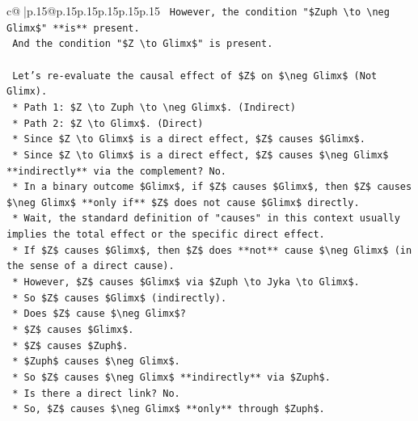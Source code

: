 \documentclass{article}
\begin{document}
{\begin{supertabular}{c@{$\;$}|p{.15\linewidth}@{}p{.15\linewidth}p{.15\linewidth}p{.15\linewidth}p{.15\linewidth}p{.15\linewidth}}
{{{\texttt{    However, the condition "\$Zuph \textbackslash{}to \textbackslash{}neg Glimx\$" **is** present.} \\
\texttt{    And the condition "\$Z \textbackslash{}to Glimx\$" is present.} \\
\\ 
\texttt{    Let's re{-}evaluate the causal effect of \$Z\$ on \$\textbackslash{}neg Glimx\$ (Not Glimx).} \\
\texttt{    *   Path 1: \$Z \textbackslash{}to Zuph \textbackslash{}to \textbackslash{}neg Glimx\$. (Indirect)} \\
\texttt{    *   Path 2: \$Z \textbackslash{}to Glimx\$. (Direct)} \\
\texttt{    *   Since \$Z \textbackslash{}to Glimx\$ is a direct effect, \$Z\$ causes \$Glimx\$.} \\
\texttt{    *   Since \$Z \textbackslash{}to Glimx\$ is a direct effect, \$Z\$ causes \$\textbackslash{}neg Glimx\$ **indirectly** via the complement? No.} \\
\texttt{    *   In a binary outcome \$Glimx\$, if \$Z\$ causes \$Glimx\$, then \$Z\$ causes \$\textbackslash{}neg Glimx\$ **only if** \$Z\$ does not cause \$Glimx\$ directly.} \\
\texttt{    *   Wait, the standard definition of "causes" in this context usually implies the total effect or the specific direct effect.} \\
\texttt{    *   If \$Z\$ causes \$Glimx\$, then \$Z\$ does **not** cause \$\textbackslash{}neg Glimx\$ (in the sense of a direct cause).} \\
\texttt{    *   However, \$Z\$ causes \$Glimx\$ via \$Zuph \textbackslash{}to Jyka \textbackslash{}to Glimx\$.} \\
\texttt{    *   So \$Z\$ causes \$Glimx\$ (indirectly).} \\
\texttt{    *   Does \$Z\$ cause \$\textbackslash{}neg Glimx\$?} \\
\texttt{    *   \$Z\$ causes \$Glimx\$.} \\
\texttt{    *   \$Z\$ causes \$Zuph\$.} \\
\texttt{    *   \$Zuph\$ causes \$\textbackslash{}neg Glimx\$.} \\
\texttt{    *   So \$Z\$ causes \$\textbackslash{}neg Glimx\$ **indirectly** via \$Zuph\$.} \\
\texttt{    *   Is there a direct link? No.} \\
\texttt{    *   So, \$Z\$ causes \$\textbackslash{}neg Glimx\$ **only** through \$Zuph\$.} \\
}}}
\end{supertabular}}
\end{document}
